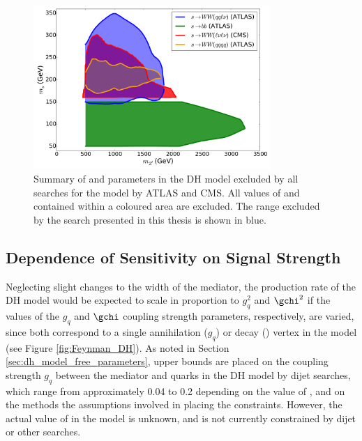 \begin{figure}[h]
  \centering
  \includegraphics[width=0.8\textwidth]{Figures/8/combined_contour.pdf}
  \caption[]{Summary of \ms and \mZp parameters in the DH model excluded by all searches for the model by ATLAS and CMS. All values of \ms and \mZp contained within a coloured area are excluded. The range excluded by the search presented in this thesis is shown in blue.}
  \label{fig:limits_comparison}
\end{figure}


\subsection{Dependence of Sensitivity on Signal Strength}

Neglecting slight changes to the width of the \Zprime mediator, the production rate of the DH model would be expected to scale in proportion to \(g_q^2\) and \(\gchi^2\) \cite{griffiths_2008} if the values of the \(g_q\) and \(\gchi\) coupling strength parameters, respectively, are varied, since both correspond to a single annihilation (\(g_q\)) or decay (\gchi) vertex in the model (see Figure \ref{fig:Feynman_DH}). As noted in Section \ref{sec:dh_model_free_parameters}, upper bounds are placed on the coupling strength \(g_q\) between the \Zprime mediator and quarks in the DH model by dijet searches, which range from approximately 0.04 to 0.2 depending on the value of \mZp, and on the methods the assumptions involved in placing the constraints. However, the actual value of \gchi in the model is unknown, and is not currently constrained by dijet or other searches. 

